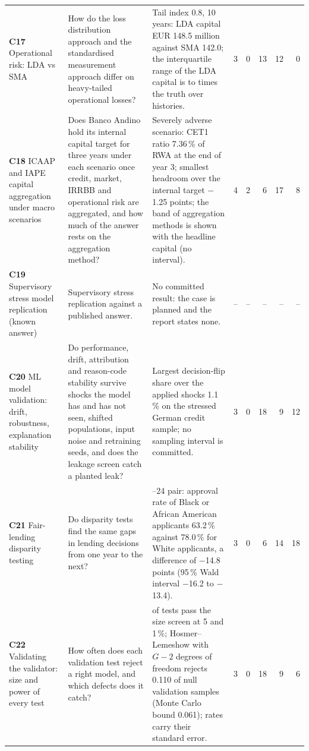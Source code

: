 {\begin{longtable}{>{\raggedright\arraybackslash}p{2.6cm}>{\raggedright\arraybackslash}p{3.7cm}>{\raggedright\arraybackslash}p{5.7cm}rrrrr}
\textbf{C17} Operational risk: LDA vs SMA & How do the loss distribution approach and the standardised measurement approach differ on heavy-tailed operational losses? & Tail index 0.8, 10 years: LDA capital EUR 148.5 million against SMA 142.0; the interquartile range of the LDA capital is \pxTwelveIqrMin{} to \pxTwelveIqrMax{} times the truth over \pxTwelveHistories{} histories. & 3 & 0 & 13 & 12 & 0 \\
\textbf{C18} ICAAP and IAPE capital aggregation under macro scenarios & Does Banco Andino hold its internal capital target for three years under each scenario once credit, market, IRRBB and operational risk are aggregated, and how much of the answer rests on the aggregation method? & Severely adverse scenario: CET1 ratio 7.36\,\% of RWA at the end of year 3; smallest headroom over the internal target $-$1.25 points; the band of aggregation methods is shown with the headline capital (no interval). & 4 & 2 & 6 & 17 & 8 \\
\textbf{C19} Supervisory stress model replication (known answer) & Supervisory stress replication against a published answer. & No committed result: the case is planned and the report states none. & -- & -- & -- & -- & -- \\
\textbf{C20} ML model validation: drift, robustness, explanation stability & Do performance, drift, attribution and reason-code stability survive shocks the model has and has not seen, shifted populations, input noise and retraining seeds, and does the leakage screen catch a planted leak? & Largest decision-flip share over the applied shocks 1.1\,\% on the stressed German credit sample; no sampling interval is committed. & 3 & 0 & 18 & 9 & 12 \\
\textbf{C21} Fair-lending disparity testing & Do disparity tests find the same gaps in lending decisions from one year to the next? & 2023--24 pair: approval rate of Black or African American applicants 63.2\,\% against 78.0\,\% for White applicants, a difference of $-$14.8 points (95\,\% Wald interval $-$16.2 to $-$13.4). & 3 & 0 & 6 & 14 & 18 \\
\textbf{C22} Validating the validator: size and power of every test & How often does each validation test reject a right model, and which defects does it catch? & 19 of \pxOneTests{} tests pass the size screen at 5 and 1\,\%; Hosmer--Lemeshow with $G-2$ degrees of freedom rejects 0.110 of null validation samples (Monte Carlo bound 0.061); \pxOneRates{} rates carry their standard error. & 3 & 0 & 18 & 9 & 6 \\
\end{longtable}
}
